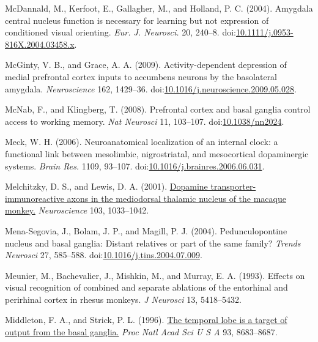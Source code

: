 \documentclass[
  11pt,
  a4paper,
]{scrbook}
\newlength{\cslhangindent}
\newenvironment{CSLReferences}[2] %
 {\begin{list}{}{%
  \setlength{\itemindent}{0pt}
  \setlength{\leftmargin}{0pt}
  \setlength{\parsep}{0pt}
  \ifodd #1
   \setlength{\leftmargin}{\cslhangindent}
   \setlength{\itemindent}{-1\cslhangindent}
  \fi
  \setlength{\itemsep}{#2\baselineskip}}}
 {\end{list}}
\begin{document}
\begin{CSLReferences}{1}{1}
McDannald, M., Kerfoot, E., Gallagher, M., and Holland, P. C. (2004).
{Amygdala central nucleus function is necessary for learning but not
expression of conditioned visual orienting.} \emph{Eur. J. Neurosci.}
20, 240--8.
doi:\href{https://doi.org/10.1111/j.0953-816X.2004.03458.x}{10.1111/j.0953-816X.2004.03458.x}.

McGinty, V. B., and Grace, A. A. (2009). {Activity-dependent depression
of medial prefrontal cortex inputs to accumbens neurons by the
basolateral amygdala.} \emph{Neuroscience} 162, 1429--36.
doi:\href{https://doi.org/10.1016/j.neuroscience.2009.05.028}{10.1016/j.neuroscience.2009.05.028}.

McNab, F., and Klingberg, T. (2008). Prefrontal cortex and basal ganglia
control access to working memory. \emph{Nat Neurosci} 11, 103--107.
doi:\href{https://doi.org/10.1038/nn2024}{10.1038/nn2024}.

Meck, W. H. (2006). {Neuroanatomical localization of an internal clock:
a functional link between mesolimbic, nigrostriatal, and mesocortical
dopaminergic systems.} \emph{Brain Res.} 1109, 93--107.
doi:\href{https://doi.org/10.1016/j.brainres.2006.06.031}{10.1016/j.brainres.2006.06.031}.

Melchitzky, D. S., and Lewis, D. A. (2001).
\href{https://www.ncbi.nlm.nih.gov/pubmed/11301210}{Dopamine
transporter-immunoreactive axons in the mediodorsal thalamic nucleus of
the macaque monkey.} \emph{Neuroscience} 103, 1033--1042.

Mena-Segovia, J., Bolam, J. P., and Magill, P. J. (2004).
Pedunculopontine nucleus and basal ganglia: Distant relatives or part of
the same family? \emph{Trends Neurosci} 27, 585--588.
doi:\href{https://doi.org/10.1016/j.tins.2004.07.009}{10.1016/j.tins.2004.07.009}.

Meunier, M., Bachevalier, J., Mishkin, M., and Murray, E. A. (1993).
Effects on visual recognition of combined and separate ablations of the
entorhinal and perirhinal cortex in rhesus monkeys. \emph{J Neurosci}
13, 5418--5432.

Middleton, F. A., and Strick, P. L. (1996).
\href{https://www.ncbi.nlm.nih.gov/pubmed/8710931}{The temporal lobe is
a target of output from the basal ganglia.} \emph{Proc Natl Acad Sci U S
A} 93, 8683--8687.


\end{CSLReferences}
\end{document}
